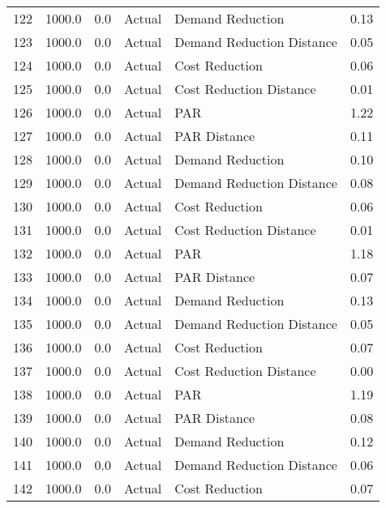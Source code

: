 \begin{longtable}{lrrllr}
122  &       1000.0 &     0.0 &         Actual &           Demand Reduction &   0.13 \\
123  &       1000.0 &     0.0 &         Actual &  Demand Reduction Distance &   0.05 \\
124  &       1000.0 &     0.0 &         Actual &             Cost Reduction &   0.06 \\
125  &       1000.0 &     0.0 &         Actual &    Cost Reduction Distance &   0.01 \\
126  &       1000.0 &     0.0 &         Actual &                        PAR &   1.22 \\
127  &       1000.0 &     0.0 &         Actual &               PAR Distance &   0.11 \\
128  &       1000.0 &     0.0 &         Actual &           Demand Reduction &   0.10 \\
129  &       1000.0 &     0.0 &         Actual &  Demand Reduction Distance &   0.08 \\
130  &       1000.0 &     0.0 &         Actual &             Cost Reduction &   0.06 \\
131  &       1000.0 &     0.0 &         Actual &    Cost Reduction Distance &   0.01 \\
132  &       1000.0 &     0.0 &         Actual &                        PAR &   1.18 \\
133  &       1000.0 &     0.0 &         Actual &               PAR Distance &   0.07 \\
134  &       1000.0 &     0.0 &         Actual &           Demand Reduction &   0.13 \\
135  &       1000.0 &     0.0 &         Actual &  Demand Reduction Distance &   0.05 \\
136  &       1000.0 &     0.0 &         Actual &             Cost Reduction &   0.07 \\
137  &       1000.0 &     0.0 &         Actual &    Cost Reduction Distance &   0.00 \\
138  &       1000.0 &     0.0 &         Actual &                        PAR &   1.19 \\
139  &       1000.0 &     0.0 &         Actual &               PAR Distance &   0.08 \\
140  &       1000.0 &     0.0 &         Actual &           Demand Reduction &   0.12 \\
141  &       1000.0 &     0.0 &         Actual &  Demand Reduction Distance &   0.06 \\
142  &       1000.0 &     0.0 &         Actual &             Cost Reduction &   0.07 \\

\end{longtable}
